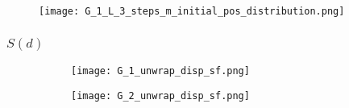        \begin{figure}
         \centering
         \texttt{[image: G\_1\_L\_3\_steps\_m\_initial\_pos\_distribution.png]}
         \caption{}
         \label{fig:G_1_L_3_steps_m_initial_pos_distribution}
       \end{figure}


























      




       \newpage

       
      \subsubsection{$S(d)$}



      \begin{figure}
        \centering
        
        \begin{subfigure}[b]{0.45\textwidth}
          \texttt{[image: G\_1\_unwrap\_disp\_sf.png]}
          \caption{}
          \label{fig:sf_g1_branch_disp}
        \end{subfigure}
        \hfill
        \begin{subfigure}[b]{0.45\textwidth}
          \texttt{[image: G\_2\_unwrap\_disp\_sf.png]}
          \caption{}
          \label{fig:sf_g2_branch_disp}
        \end{subfigure}

        \caption{}
        \label{fig:sf_branch_disp}

      \end{figure}




